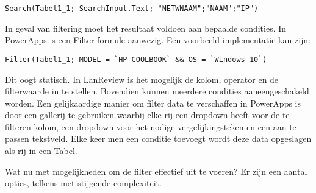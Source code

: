 \begin{lstlisting}
Search(Tabel1_1; SearchInput.Text; "NETWNAAM";"NAAM";"IP")
\end{lstlisting}

In geval van filtering moet het resultaat voldoen aan bepaalde condities. In PowerApps is een Filter formule aanwezig. Een voorbeeld implementatie kan zijn:

\begin{lstlisting}
Filter(Tabel1_1; MODEL = `HP COOLBOOK` && OS = `Windows 10`)
\end{lstlisting}

Dit oogt statisch. In LanReview is het mogelijk de kolom, operator en de filterwaarde in te stellen. Bovendien kunnen meerdere condities aaneengeschakeld worden.
Een gelijkaardige manier om filter data te verschaffen in PowerApps is door een gallerij te gebruiken waarbij elke rij een dropdown heeft voor de te filteren kolom, een dropdown voor het nodige vergelijkingsteken en een aan te passen tekstveld. Elke keer men een conditie toevoegt wordt deze data opgeslagen als rij in een Tabel.


Wat nu met mogelijkheden om de filter effectief uit te voeren? Er zijn een aantal opties, telkens met stijgende complexiteit.

